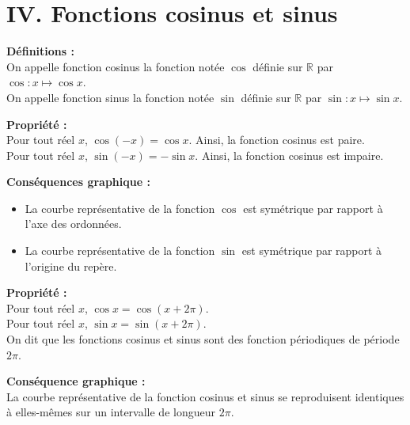 \documentclass[11pt,a4paper]{article}
\begin{document}
\newpage

\section*{IV. Fonctions cosinus et sinus}

\begin{mdframed}[style=definitionStyle]
    \textbf{Définitions :} ~\\
    On appelle fonction cosinus la fonction notée $\cos$ définie sur $\mathbb{R}$ par $\cos:x\mapsto\cos x$. \\
    On appelle fonction sinus la fonction notée $\sin$ définie sur $\mathbb{R}$ par $\sin:x\mapsto\sin x$.
\end{mdframed}

\begin{mdframed}[style=proprieteStyle]
    \textbf{Propriété :} ~\\
    Pour tout réel $x$, $\cos(-x)=\cos{x}$. Ainsi, la fonction cosinus est paire. \\
    Pour tout réel $x$, $\sin(-x)=-\sin{x}$. Ainsi, la fonction cosinus est impaire.
\end{mdframed}

\textbf{Conséquences graphique :}
\vspace{-4pt}
\begin{itemize}
    \item La courbe représentative de la fonction $\cos$ est symétrique par rapport à l'axe des ordonnées.
    \item La courbe représentative de la fonction $\sin$ est symétrique par rapport à l'origine du repère.
\end{itemize}

\begin{mdframed}[style=proprieteStyle]
    \textbf{Propriété :} ~\\
    Pour tout réel $x$, $\cos{x}=\cos(x+2\pi)$.\\
    Pour tout réel $x$, $\sin{x}=\sin(x+2\pi)$.\\
    On dit que les fonctions cosinus et sinus sont des fonction périodiques de période $2\pi$.
\end{mdframed}

\textbf{Conséquence graphique :} ~\\
La courbe représentative de la fonction cosinus et sinus se reproduisent identiques à elles-mêmes sur un intervalle de longueur $2\pi$.
\end{document}
